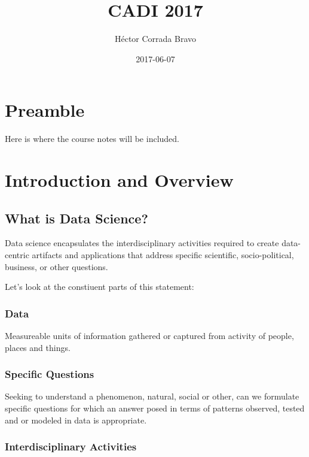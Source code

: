 \documentclass[]{article}
\title{CADI 2017}
\author{Héctor Corrada Bravo}
\date{2017-06-07}
\theoremstyle{definition}
\theoremstyle{definition}
\theoremstyle{remark}
\begin{document}
\maketitle


{
\hypersetup{linkcolor=black}
\setcounter{tocdepth}{2}
\tableofcontents
}
\section{Preamble}\label{preamble}

Here is where the course notes will be included.

\section{Introduction and Overview}\label{introduction-and-overview}

\subsection{What is Data Science?}\label{what-is-data-science}

Data science encapsulates the interdisciplinary activities required to
create data-centric artifacts and applications that address specific
scientific, socio-political, business, or other questions.

Let's look at the constiuent parts of this statement:

\subsubsection{Data}\label{data}

Measureable units of information gathered or captured from activity of
people, places and things.

\subsubsection{Specific Questions}\label{specific-questions}

Seeking to understand a phenomenon, natural, social or other, can we
formulate specific questions for which an answer posed in terms of
patterns observed, tested and or modeled in data is appropriate.

\subsubsection{Interdisciplinary
Activities}\label{interdisciplinary-activities}
\end{document}
